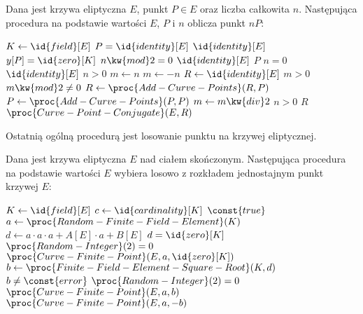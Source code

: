 \begin{algorithm}
Dana jest krzywa eliptyczna $E$,
punkt $P \in E$ oraz liczba całkowita $n$.
Następująca procedura
na podstawie wartości $E$, $P$ i $n$
oblicza
punkt $nP$:

\begin{codebox}
\li
    $K \gets \id{field}[E]$
\li
    \If $P = \id{identity}[E]$
\li
        \Then
            \Return $\id{identity}[E]$
        \End
\li
    \If $y[P] = \id{zero}[K]$
\li
        \Then
            \If $n \kw{ mod } 2 = 0$
\li
                \Then
                    \Return $\id{identity}[E]$
\li
                \Else
                    \Return $P$
                \End
        \End
\li
    \If $n = 0$
\li
        \Then
            \Return $\id{identity}[E]$
        \End
\li
    \If $n > 0$
\li
        \Then
            $m \gets n$
\li
        \Else
            $m \gets -n$
        \End
\li
    $R \gets \id{identity}[E]$
\li
    \While $m > 0$
\li
        \Do
            \If $m \kw{ mod } 2 \neq 0$
\li
                \Then
                    $R \gets \proc{Add-Curve-Points}(R, P)$
                \End
\li
            $P \gets \proc{Add-Curve-Points}(P, P)$
\li
            $m \gets m \kw{ div } 2$
        \End
\li
    \If $n > 0$
\li
        \Then
            \Return $R$
\li
        \Else
            \Return $\proc{Curve-Point-Conjugate}(E, R)$
        \End
\end{codebox}
\end{algorithm}

\noindent
Ostatnią ogólną procedurą jest losowanie punktu na krzywej eliptycznej.

\begin{algorithm}
Dana jest krzywa eliptyczna $E$ nad ciałem skończonym.
Następująca procedura
na podstawie wartości $E$
wybiera losowo z rozkładem jednostajnym
punkt krzywej $E$:

\begin{codebox}
\li
    $K \gets \id{field}[E]$
\li
    $c \gets \id{cardinality}[K]$
\li
    \While $\const{true}$
\li
        \Do
            $a \gets \proc{Random-Finite-Field-Element}(K)$
\li
            $d \gets a \cdot a \cdot a + A[E] \cdot a + B[E]$
\li
            \If $d = \id{zero}[K]$
\li
                \Then
                    \If $\proc{Random-Integer}(2) = 0$
\li
                        \Then
                                    \Return $\proc{Curve-Finite-Point}(E, a, \id{zero}[K])$
                        \End
\li
                \Else
                    $b \gets \proc{Finite-Field-Element-Square-Root}(K, d)$
\li
                    \If $b \neq \const{error}$
\li
                        \Then
                            \If $\proc{Random-Integer}(2) = 0$
\li
                                \Then
                                    \Return $\proc{Curve-Finite-Point}(E, a, b)$
\li
                                \Else
                                    \Return $\proc{Curve-Finite-Point}(E, a, -b)$
                                \End
                        \End
                \End
        \End
\end{codebox}
\end{algorithm}

